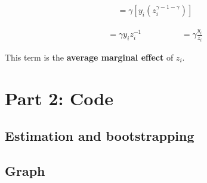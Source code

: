 \documentclass{article}
\begin{document}
\begin{align}
    = \gamma \left[y_i \left(z_i ^ {\gamma - 1 - \gamma} \right) \right]
\end{align}

\begin{align}
    = \gamma y_i z_i ^{-1} \hspace{2cm}= \gamma \frac{y_i}{z_i}
\end{align}

This term is the \textbf{average marginal effect} of $z_i$.

\section{Part 2: Code}

\subsection{Estimation and bootstrapping}

\subsection{Graph}
\end{document}
